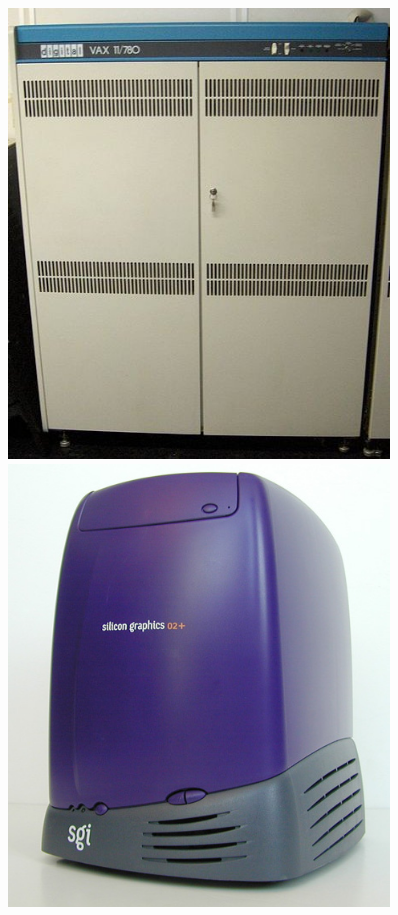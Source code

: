 \begin{figure}[t]
	\centering
	\begin{minipage}{.4\linewidth}
		\centering
		\includegraphics[width=0.9\textwidth]{02/pics/VAX_11-780_intero}
	\end{minipage}
	\hfill
	\begin{minipage}{.4\linewidth}
		\centering
		\includegraphics[width=0.9\textwidth]{02/pics/Silicon_Graphics_O2_Plus}

\end{minipage}
\end{figure}
